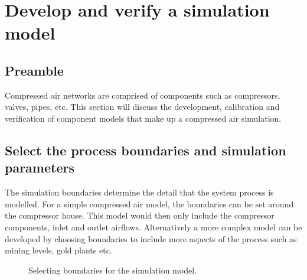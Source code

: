 \section{Develop and verify a simulation model}
	\subsection{Preamble}
	Compressed air networks are comprised of components such as compressors, valves, pipes, etc. This section will discuss the development, calibration and verification of component models that make up a compressed air simulation. 
	
	\subsection{Select the process boundaries and simulation parameters}
	The simulation boundaries determine the detail that the system process is modelled. For a simple compressed air model, the boundaries can be set around the compressor house. This model would then only include the compressor components, inlet and outlet airflows. Alternatively a more complex model can be developed by choosing boundaries to include more aspects of the process such as mining levels, gold plants etc.
	
	 \begin{figure}[h]
	 	\centering
	 	\caption{ Selecting boundaries for the simulation model.}
	 	\label{fig: Sensitivity}
	 \end{figure}
 
